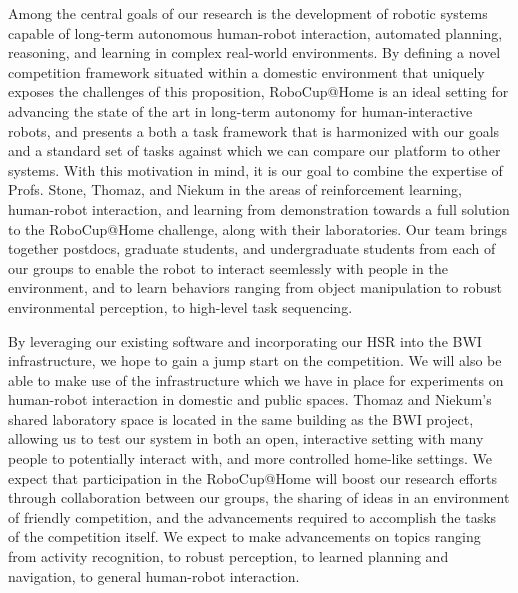 \documentclass[runningheads,a4paper]{llncs}
\begin{document}
Among the central goals of our research is the development of robotic systems capable of long-term autonomous human-robot interaction, automated planning, reasoning, and learning in complex real-world environments. By defining a novel competition framework situated within a domestic environment that uniquely exposes the challenges of this proposition, RoboCup@Home is an ideal setting for advancing the state of the art in long-term autonomy for human-interactive robots, and presents a both a task framework that is harmonized with our goals and a standard set of tasks against which we can compare our platform to other systems. With this motivation in mind, it is our goal to combine the expertise of Profs. Stone, Thomaz, and Niekum in the areas of reinforcement learning, human-robot interaction, and learning from demonstration towards a full solution to the RoboCup@Home challenge, along with their laboratories. Our team brings together postdocs, graduate students, and undergraduate students from each of our groups to enable the robot to interact seemlessly with people in the environment, and to learn behaviors ranging from object manipulation to robust environmental perception, to high-level task sequencing.

By leveraging our existing software and incorporating our HSR into the BWI infrastructure, we hope to gain a jump start on the competition. We will also be able to make use of the infrastructure which we have in place for experiments on human-robot interaction in domestic and public spaces. Thomaz and Niekum's shared laboratory space is located in the same building as the BWI project, allowing us to test our system in both an open, interactive setting with many people to potentially interact with, and more controlled home-like settings. We expect that participation in the RoboCup@Home will boost our research efforts through collaboration between our groups, the sharing of ideas in an environment of friendly competition, and the advancements required to accomplish the tasks of the competition itself. We expect to make advancements on topics ranging from activity recognition, to robust perception, to learned planning and navigation, to general human-robot interaction.


\end{document}
